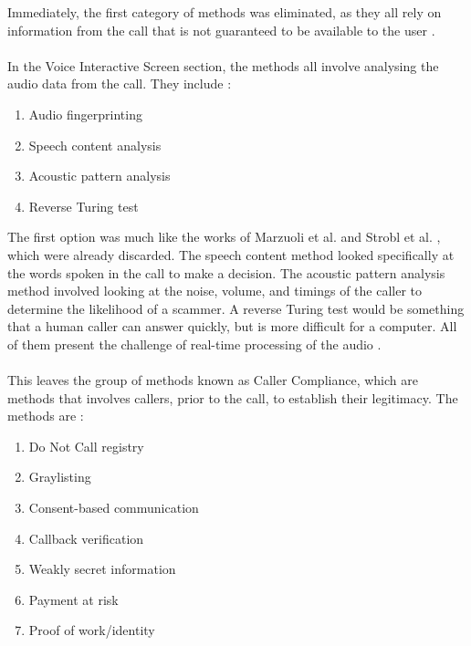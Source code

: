 \documentclass[main.tex]{subfiles}
\begin{document}
Immediately, the first category of methods was eliminated, as they all rely on information from the call that is not guaranteed to be available to the user \cite{cisco}.
\\\\
In the Voice Interactive Screen section, the methods all involve analysing the audio data from the call. They include \cite{cisco}:
\begin{enumerate}
	\item Audio fingerprinting
	\item Speech content analysis
	\item Acoustic pattern analysis
	\item Reverse Turing test
\end{enumerate}

The first option was much like the works of Marzuoli et al. \cite{marzuoli} and Strobl et al. \cite{strobl}, which were already discarded. The speech content method looked specifically at the words spoken in the call to make a decision. The acoustic pattern analysis method involved looking at the noise, volume, and timings of the caller to determine the likelihood of a scammer. A reverse Turing test would be something that a human caller can answer quickly, but is more difficult for a computer. All of them present the challenge of real-time processing of the audio \cite{cisco}.
\\\\
This leaves the group of methods known as Caller Compliance, which are methods that involves callers, prior to the call, to establish their legitimacy. The methods are \cite{cisco}:
\begin{enumerate}
	\item Do Not Call registry
	\item Graylisting
	\item Consent-based communication
	\item Callback verification
	\item Weakly secret information
	\item Payment at risk
	\item Proof of work/identity
\end{enumerate}
\end{document}
